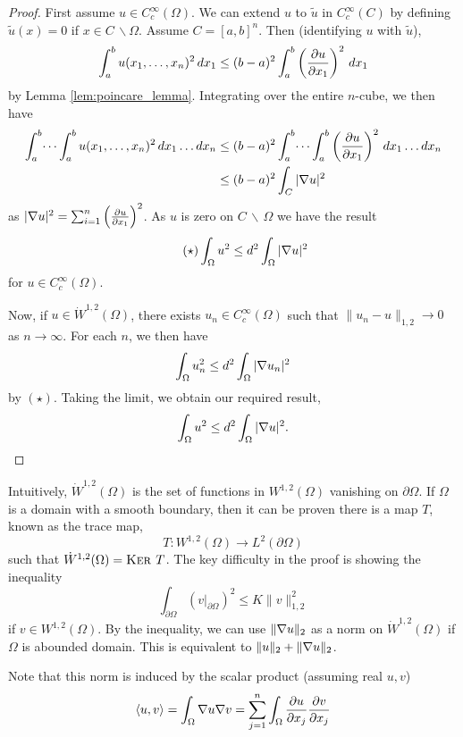 \documentclass[10pt, oneside, reqno]{amsart}
\theoremstyle{plain}%
\numberwithin{equation}{section}
\theoremstyle{definition}
\theoremstyle{remark}
\renewcommand{\ker}{\textsc{Ker\ }}
\newcommand{\iprod}[1]{\left\langle #1 \right\rangle}
\begin{document}
\begin{proof}
    First assume $u \in C^\infty_c(\Omega)$.  We can extend $u$ to $\tilde u$ in $C^\infty_c(C)$ by defining $\tilde u(x) = 0$ if $x \in C \, \backslash \Omega$.  Assume $C = [a, b]^n$.  Then (identifying $u$ with $\tilde u$), \begin{align*}
        \int_a^b  u(x_1, \dots, x_n)^2 \, dx_1 \leq (b-a)^2 \int_a^b \left(\frac{\partial u}{\partial x_1} \right)^2 \, dx_1
    \end{align*} by Lemma \ref{lem:poincare_lemma}.  Integrating over the entire $n$-cube, we then have \begin{align*}
        \int_a^b \dots \int_a^b u(x_1, \dots, x_n)^2 \, dx_1 \dots dx_n &\leq (b-a)^2 \int_a^b \dots \int_a^b \left(\frac{\partial u}{\partial x_1} \right)^2 \, dx_1 \dots dx_n \\
        &\leq (b-a)^2 \int_C |\nabla u|^2 
    \end{align*} as $|\nabla u |^2 = \sum_{i=1}^n \left(\frac{\partial u}{\partial x_1} \right)^2$.  As $u$ is zero on $C \, \backslash \, \Omega$ we have the result \[
    \tag{$\star$}
        \int_\Omega u^2 \leq d^2 \int_\Omega |\nabla u|^2
    \] for $u \in C^\infty_c(\Omega)$.  
    
    Now, if $u \in \dot W^{1, 2}(\Omega)$, there exists $u_n \in C^\infty_c(\Omega)$ such that $\| u_n - u \|_{1, 2} \rightarrow 0$ as $n \rightarrow \infty$.  For each $n$, we then have \[
        \int_\Omega u_n^2 \leq d^2 \int_\Omega |\nabla u_n |^2
    \] by $(\star)$.  Taking the limit, we obtain our required result, \[
        \int_\Omega u^2 \leq d^2 \int_\Omega |\nabla u|^2. \qedhere
    \] 
\end{proof}

Intuitively, $\dot W^{1, 2}(\Omega)$ is the set of functions in $W^{1, 2}(\Omega)$ vanishing on $\partial \Omega$.  If $\Omega$ is a domain with a smooth boundary, then it can be proven there is a map $T$, known as the trace map, \[
    T : W^{1, 2}(\Omega) \rightarrow L^2(\partial \Omega)
\] such that $\dot W^{1, 2}(\Omega) = \ker T$.   The key difficulty in the proof is showing the inequality \[
    \int_{\partial \Omega} \left(v|_{\partial \Omega}\right)^2 \leq K \| v \|_{1, 2}^2
\] if $v \in W^{1, 2}(\Omega)$.  By the \poincare inequality, we can use $\| \nabla u \|_2$ as a norm on $\dot W^{1, 2}(\Omega)$ if $\Omega$ is abounded domain.  This is equivalent to $\|u \|_2 + \| \nabla u \|_2$.  

Note that this norm is induced by the scalar product (assuming real $u, v$) \[
    \iprod{u, v} = \int_\Omega \grad u \grad v =  \sum_{j=1}^n \int_\Omega \parder{u}{x_j} \parder{v}{x_j}
\]
\end{document}

